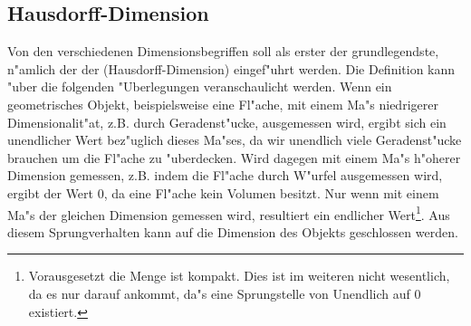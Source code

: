 \subsection{Hausdorff-Dimension}
Von den verschiedenen Dimensionsbegriffen soll als erster der grundlegendste, n"amlich der
der \begriff(Hausdorff-Dimension) eingef"uhrt werden. Die Definition kann "uber die
folgenden "Uberlegungen veranschaulicht werden. Wenn ein geometrisches Objekt,
beispielsweise eine Fl"ache, mit einem Ma"s niedrigerer Dimensionalit"at, z.B. durch
Geradenst"ucke, ausgemessen wird, ergibt sich ein unendlicher Wert bez"uglich dieses
Ma"ses, da wir unendlich viele Geradenst"ucke brauchen um die Fl"ache zu "uberdecken. Wird
dagegen mit einem Ma"s h"oherer Dimension gemessen, z.B. indem die Fl"ache durch W"urfel
ausgemessen wird, ergibt der Wert 0, da eine Fl"ache kein Volumen besitzt. Nur wenn mit
einem Ma"s der gleichen Dimension gemessen wird, resultiert ein endlicher
Wert\footnote{Vorausgesetzt die Menge ist kompakt. Dies ist im weiteren nicht wesentlich,
  da es nur darauf ankommt, da"s eine Sprungstelle von Unendlich auf 0 existiert.}. Aus
diesem Sprungverhalten kann auf die Dimension des Objekts geschlossen werden.

